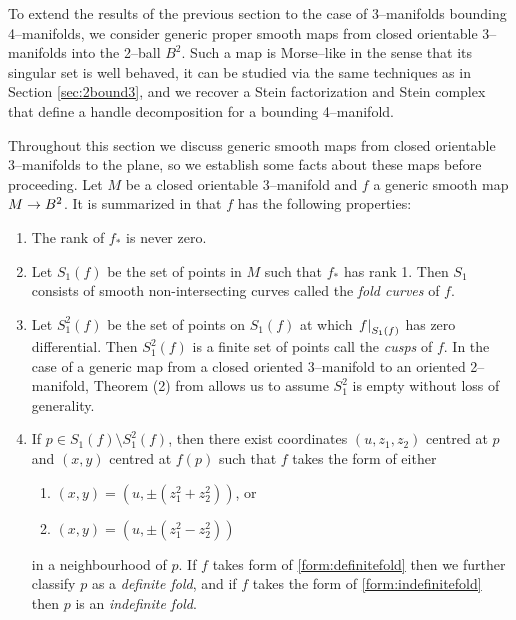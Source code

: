 \label{sec:3bound4}


To extend the results of the previous section to the case of 3--manifolds bounding 4--manifolds, we consider generic proper smooth maps from closed orientable 3--manifolds into the 2--ball $B^2$.
Such a map is Morse--like in the sense that its singular set is well behaved, it can be studied via the same techniques as in Section \ref{sec:2bound3}, and we recover a Stein factorization and Stein complex that define a handle decomposition for a bounding 4--manifold.

Throughout this section we discuss generic smooth maps from closed orientable 3--manifolds to the plane, so we establish some facts about these maps before proceeding.
Let $M$ be a closed orientable 3--manifold and $f$ a generic smooth map $M\to B^2$.
It is summarized in \cite{Levine65} that $f$ has the following properties:
\begin{enumerate}
	\item
		The rank of $f_*$ is never zero.
	
	\item
		Let $S_1(f)$ be the set of points in $M$ such that $f_*$ has rank 1.
		Then $S_1$ consists of smooth non-intersecting curves called the \emph{fold curves} of $f$.
	
	\item
		Let $S_1^2(f)$ be the set of points on $S_1(f)$ at which $\left.f\right|_{S_1(f)}$ has zero differential.
		Then $S_1^2(f)$ is a finite set of points call the \emph{cusps} of $f$.
		In the case of a generic map from a closed oriented 3--manifold to an oriented 2--manifold, Theorem (2) from \cite{Levine65} allows us to assume $S_1^2$ is empty without loss of generality.
	
	\item
		If $p\in S_1(f)\setminus S_1^2(f)$, then there exist coordinates $(u,z_1,z_2)$ centred at $p$ and $(x,y)$ centred at $f(p)$ such that $f$ takes the form of either
		\begin{enumerate}
			\item \label{form:definitefold} $(x,y)=(u,\pm(z_1^2+z_2^2))$, or			
			\item \label{form:indefinitefold} $(x,y)=(u,\pm(z_1^2-z_2^2))$
		\end{enumerate}
		in a neighbourhood of $p$.
		If $f$ takes form of \ref{form:definitefold} then we further classify $p$ as a \emph{definite fold}, and if $f$ takes the form of \ref{form:indefinitefold} then $p$ is an \emph{indefinite fold}.
\end{enumerate}

